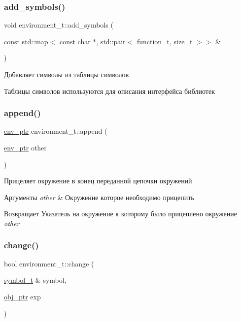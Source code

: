 \subsubsection{\texorpdfstring{add\+\_\+symbols()}{add\_symbols()}}
{\footnotesize\ttfamily void environment\+\_\+t\+::add\+\_\+symbols (\begin{DoxyParamCaption}\item[{const std\+::map$<$ const char $\ast$, std\+::pair$<$ function\+\_\+t, size\+\_\+t $>$$>$ \&}]{ }\end{DoxyParamCaption})}



Добавляет символы из таблицы символов 

Таблицы символов используются для описания интерфейса библиотек \mbox{\label{classenvironment__t_a2b3db01d40e9b94f8234252768a5a396}} 
\subsubsection{\texorpdfstring{append()}{append()}}
{\footnotesize\ttfamily \mbox{\hyperlink{classmm__ptr}{env\+\_\+ptr}} environment\+\_\+t\+::append (\begin{DoxyParamCaption}\item[{\mbox{\hyperlink{classmm__ptr}{env\+\_\+ptr}}}]{other }\end{DoxyParamCaption})}



Прицеляет окружение в конец переданной цепочки окружений 


\begin{DoxyParams}{Аргументы}
{\em other} & Окружение которое необходимо прицепить \\
\hline
\end{DoxyParams}
\begin{DoxyReturn}{Возвращает}
Указатель на окружение к которому было прицеплено окружение {\itshape other} 
\end{DoxyReturn}
\mbox{\label{classenvironment__t_a73cbdbc4b02e7efd863b5d4cbc3bc6c8}} 
\subsubsection{\texorpdfstring{change()}{change()}}
{\footnotesize\ttfamily bool environment\+\_\+t\+::change (\begin{DoxyParamCaption}\item[{\mbox{\hyperlink{lisp__types_8hpp_a543c62d3ca4ba3750602b9c6b11af1de}{symbol\+\_\+t}} \&}]{symbol,  }\item[{\mbox{\hyperlink{classmm__ptr}{obj\+\_\+ptr}}}]{exp }\end{DoxyParamCaption})}



